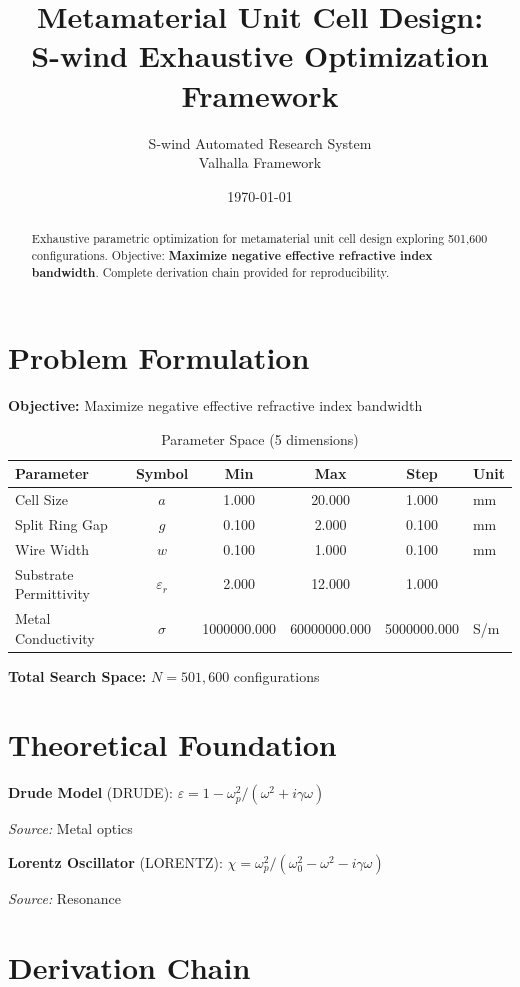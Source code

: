 \documentclass[11pt,twocolumn]{article}
\title{Metamaterial Unit Cell Design: \\S-wind Exhaustive Optimization Framework}
\author{S-wind Automated Research System\\Valhalla Framework}
\date{\today}
\begin{document}
\maketitle

\begin{abstract}
Exhaustive parametric optimization for metamaterial unit cell design exploring 501,600 configurations.
Objective: \textbf{Maximize negative effective refractive index bandwidth}.
Complete derivation chain provided for reproducibility.
\end{abstract}

\section{Problem Formulation}
\textbf{Objective:} Maximize negative effective refractive index bandwidth

\begin{table}[h]
\centering
\caption{Parameter Space (5 dimensions)}
\begin{tabular}{@{}lccccl@{}}
\toprule
Parameter & Symbol & Min & Max & Step & Unit \\
\midrule
Cell Size & $a$ & 1.000 & 20.000 & 1.000 & mm \\
Split Ring Gap & $g$ & 0.100 & 2.000 & 0.100 & mm \\
Wire Width & $w$ & 0.100 & 1.000 & 0.100 & mm \\
Substrate Permittivity & $\varepsilon_r$ & 2.000 & 12.000 & 1.000 &  \\
Metal Conductivity & $\sigma$ & 1000000.000 & 60000000.000 & 5000000.000 & S/m \\
\bottomrule
\end{tabular}
\end{table}

\textbf{Total Search Space:} $N = 501,600$ configurations

\section{Theoretical Foundation}
\textbf{Drude Model} (DRUDE): $\varepsilon = 1 - \omega_p^2/(\omega^2 + i\gamma\omega)$

\textit{Source:} Metal optics

\textbf{Lorentz Oscillator} (LORENTZ): $\chi = \omega_p^2/(\omega_0^2 - \omega^2 - i\gamma\omega)$

\textit{Source:} Resonance


\section{Derivation Chain}
\end{document}
